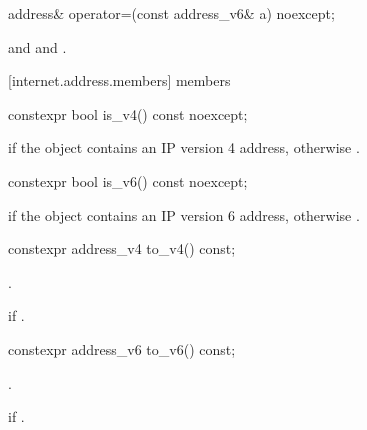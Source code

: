 \begin{itemdecl}
address& operator=(const address_v6& a) noexcept;
\end{itemdecl}

\begin{itemdescr}
\pnum
\postconditions {} and  and .

\pnum
\returns {}
\end{itemdescr}



[internet.address.members]{ members}

%
\begin{itemdecl}
constexpr bool is_v4() const noexcept;
\end{itemdecl}

\begin{itemdescr}
\pnum
\returns {} if the object contains an IP version 4 address, otherwise .
\end{itemdescr}

%
\begin{itemdecl}
constexpr bool is_v6() const noexcept;
\end{itemdecl}

\begin{itemdescr}
\pnum
\returns {} if the object contains an IP version 6 address, otherwise .
\end{itemdescr}

%
\begin{itemdecl}
constexpr address_v4 to_v4() const;
\end{itemdecl}

\begin{itemdescr}
\pnum
\returns {}.

\pnum
\remarks {} if .
\end{itemdescr}

%
\begin{itemdecl}
constexpr address_v6 to_v6() const;
\end{itemdecl}

\begin{itemdescr}
\pnum
\returns {}.

\pnum
\remarks {} if .
\end{itemdescr}

